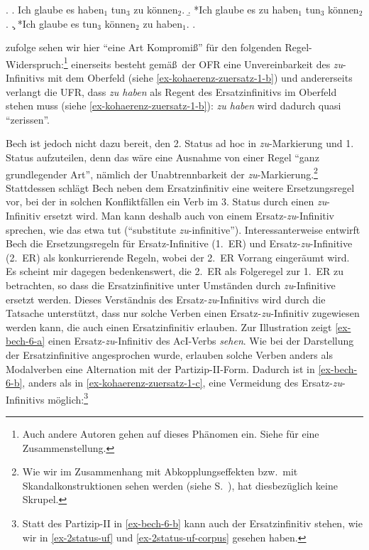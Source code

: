 \ex. 
\a. Ich glaube es haben$_1$ tun$_3$ zu können$_2$. \label{ex-kohaerenz-zuersatz-1}
\b. *Ich glaube es zu haben$_1$ tun$_3$ können$_2$. \label{ex-kohaerenz-zuersatz-1-b}
\c. *Ich glaube es tun$_3$ können$_2$ zu haben$_1$. \label{ex-kohaerenz-zuersatz-1-c}
\z. \citep[\S 14]{Bech:63}

\cite{Bech:63} zufolge sehen wir hier "`eine Art Kompromi\ss "' für den folgenden Regel-Wider\-spruch:\footnote{Auch andere Autoren gehen auf dieses Phänomen ein. Siehe \citet[70]{Meurers:99} für eine Zusammenstellung.} einerseits besteht gemä\ss\ der OFR eine Unvereinbarkeit des \emph{zu}-Infinitivs mit dem Oberfeld (siehe \ref{ex-kohaerenz-zuersatz-1-b}) und andererseits verlangt die UFR, dass {\it zu haben} als Regent des Ersatzinfinitivs im Oberfeld stehen muss (siehe \ref{ex-kohaerenz-zuersatz-1-b}): {\it zu haben} wird dadurch quasi "`zerissen"'. 

Bech ist jedoch nicht dazu bereit, den 2. Status ad hoc in {\it zu}-Markierung und 1. Status aufzuteilen, denn das wäre eine Ausnahme von einer Regel "`ganz grundlegender Art"', nämlich der Unabtrennbarkeit der {\it zu}-Markierung.\footnote{Wie wir im Zusammenhang mit Abkopplungseffekten bzw.\ mit Skandalkonstruktionen sehen werden (siehe S.~\pageref{sec-skandal}), hat \cite{Vogel:09} diesbezüglich keine Skrupel.} Stattdessen schlägt Bech neben dem Ersatzinfinitiv eine weitere Ersetzungsregel vor, bei der in solchen Konfliktfällen ein Verb im 3. Status durch einen \emph{zu}-Infinitiv ersetzt wird. Man kann deshalb auch von einem Ersatz-\emph{zu}-Infinitiv sprechen, wie das etwa \citet[70ff]{Meurers:99} tut ("`substitute \emph{zu}-infinitive"'). Interessanterweise entwirft Bech die Ersetzungsregeln für Ersatz-Infinitive (1.~ER) und Ersatz-\emph{zu}-Infinitive (2.~ER) als konkurrierende Regeln, wobei der 2.~ER Vorrang eingeräumt wird. Es scheint  mir dagegen bedenkenswert, die 2.~ER als Folgeregel zur 1.~ER zu betrachten, so dass die Ersatzinfinitive unter Umständen durch \emph{zu}-Infinitive ersetzt werden. Dieses Verständnis des Ersatz-\emph{zu}-Infinitivs wird durch die Tatsache unterstützt, dass nur solche Verben einen Ersatz-\emph{zu}-Infinitiv zugewiesen werden kann, die auch einen Ersatzinfinitiv erlauben. Zur Illustration zeigt \ref{ex-bech-6-a} einen Ersatz-\emph{zu}-Infinitiv des AcI-Verbs {\it sehen}. Wie bei der Darstellung der Ersatzinfinitive angesprochen wurde, erlauben solche Verben anders als Modalverben eine Alternation mit der Partizip-II-Form. Dadurch ist in \ref{ex-bech-6-b}, anders als in \ref{ex-kohaerenz-zuersatz-1-c}, eine Vermeidung des Ersatz-\emph{zu}-Infinitivs möglich:\footnote{Statt des Partizip-II in \ref{ex-bech-6-b} kann auch der Ersatzinfinitiv stehen, wie wir in \ref{ex-2status-uf} und \ref{ex-2status-uf-corpus} gesehen haben.}

